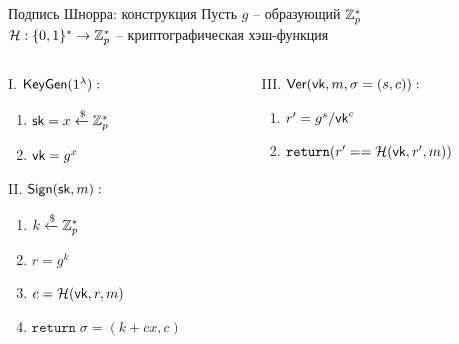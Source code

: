 \documentclass[usenames,dvipsnames,8pt,aspectratio=169]{beamer}
\begin{document}
\begin{frame}{Подпись Шнорра: конструкция}
\Large 
 Пусть $g$ -- образующий ${{\mathbb Z}}_p^\ast$ \\[3pt]
$\mathcal{H}: \{0,1\}^\ast \rightarrow {{\mathbb Z}}_p^\ast$ -- криптографическая хэш-функция
\vspace{10pt}
\begin{columns}[T]
	\begin{column}{0.45\textwidth}
		{\color{Orange} I. $\mathsf{\textsf{KeyGen}}(1^\lambda):$}
		\begin{enumerate}
			\itemsep4pt
			\item $\textsf{sk} = x \xleftarrow{\$} {{\mathbb Z}}_p^\ast$
			\item $\textsf{vk} = g^x$
		\end{enumerate}
		\vspace{10pt}
		{\color{Orange} II. $\mathsf{Sign}(\textsf{sk}, m):$}
		\begin{enumerate}
			\itemsep4pt
			\item $ k \xleftarrow{\$} {{\mathbb Z}}_p^\ast$
			\item $r = g^k$ \\
			\item $c = \mathcal{H}(\textsf{vk}, r, m)$
			\item $\mathtt{return} \; \sigma = (k+ cx, c)$
		\end{enumerate}
	\end{column}
	\begin{column}{0.45\textwidth}
		{\color{Orange} III. $\mathsf{Ver}(\textsf{vk}, m, \sigma = (s, c)):$}
		\begin{enumerate}
			\itemsep4pt
			\item $r' = g^s /\textsf{vk}^c $
			\item $\mathtt{return}(r'==\mathcal{H}(\textsf{vk}, r', m))$ \\
		\end{enumerate}
	\end{column}
	\end{columns}
\end{frame}
\end{document}
